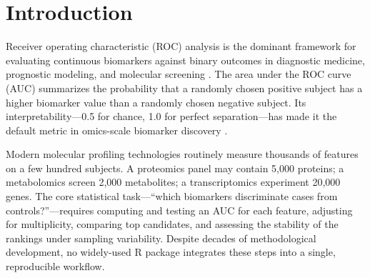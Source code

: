 \documentclass[11pt,a4paper]{article}
\begin{document}
\section{Introduction}

Receiver operating characteristic (ROC) analysis is the dominant framework
for evaluating continuous biomarkers against binary outcomes in diagnostic
medicine, prognostic modeling, and molecular screening
\citep{Hanley1982,DeLong1988,Pepe2004}.  The area under the ROC curve (AUC)
summarizes the probability that a randomly chosen positive subject has a
higher biomarker value than a randomly chosen negative subject.  Its
interpretability---0.5 for chance, 1.0 for perfect separation---has made it
the default metric in omics-scale biomarker discovery \citep{Robin2011}.

Modern molecular profiling technologies routinely measure thousands of
features on a few hundred subjects.  A proteomics panel may contain 5{,}000
proteins; a metabolomics screen 2{,}000 metabolites; a transcriptomics
experiment 20{,}000 genes.  The core statistical task---``which biomarkers
discriminate cases from controls?''---requires computing and testing an AUC
for each feature, adjusting for multiplicity, comparing top candidates, and
assessing the stability of the rankings under sampling variability.  Despite
decades of methodological development, no widely-used R package integrates
these steps into a single, reproducible workflow.
\end{document}
